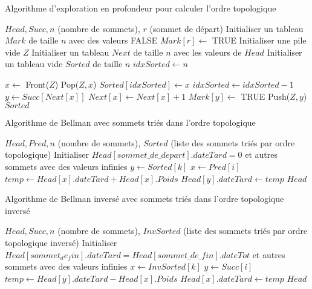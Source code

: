 \documentclass{article}
\begin{document}
\begin{algorithm}[H]
\caption{Algorithme d'exploration en profondeur pour calculer l'ordre topologique}
\begin{algorithmic}[1]
\REQUIRE $Head, Succ, n$ (nombre de sommets), $r$ (sommet de départ)
\STATE Initialiser un tableau $Mark$ de taille $n$ avec des valeurs FALSE
\STATE $Mark[r] \gets$ TRUE
\STATE Initialiser une pile vide $Z$
\STATE Initialiser un tableau $Next$ de taille $n$ avec les valeurs de $Head$
\STATE Initialiser un tableau vide $Sorted$ de taille $n$
\STATE $idxSorted \gets n$

\REPEAT
    \STATE $x \gets$ Front($Z$)
        \STATE Pop($Z, x$)
        \STATE $Sorted[idxSorted] \gets x$
        \STATE $idxSorted \gets idxSorted - 1$
    \ELSE
        \STATE $y \gets Succ[Next[x]]$
        \STATE $Next[x] \gets Next[x] + 1$
            \STATE $Mark[y] \gets$ TRUE
            \STATE Push({$Z, y$})
        \ENDIF
    \ENDIF
{}
\RETURN $Sorted$
\end{algorithmic}
\end{algorithm}

\begin{algorithm}[H]
\caption{Algorithme de Bellman avec sommets triés dans l'ordre topologique}
\begin{algorithmic}[1]
\REQUIRE $Head, Pred, n$ (nombre de sommets), $Sorted$ (liste des sommets triés par ordre topologique)
\STATE Initialiser $Head[sommet\_de\_depart].dateTard = 0$ et autres sommets avec des valeurs infinies
	\STATE $y \gets Sorted[k]$
		\STATE $x \gets Pred[i]$
		\STATE $temp \gets Head[x].dateTard + Head[x].Poids$
			\STATE $Head[y].dateTard \gets temp$
		\ENDIF
	\ENDFOR
\ENDFOR
\RETURN $Head$
\end{algorithmic}
\end{algorithm}

\begin{algorithm}[H]
\caption{Algorithme de Bellman inversé avec sommets triés dans l'ordre topologique inversé}
\begin{algorithmic}[1]
\REQUIRE $Head, Succ, n$ (nombre de sommets), $InvSorted$ (liste des sommets triés par ordre topologique inversé)
\STATE Initialiser $Head[sommet_de_fin].dateTard = Head[sommet\_de\_fin].dateTot$ et autres sommets avec des valeurs infinies
	\STATE $x \gets InvSorted[k]$
		\STATE $y \gets Succ[i]$
		\STATE $temp \gets Head[y].dateTard - Head[x].Poids$
			\STATE $Head[x].dateTard \gets temp$
		\ENDIF
	\ENDFOR
\ENDFOR
\RETURN $Head$
\end{algorithmic}
\end{algorithm}
\end{document}
